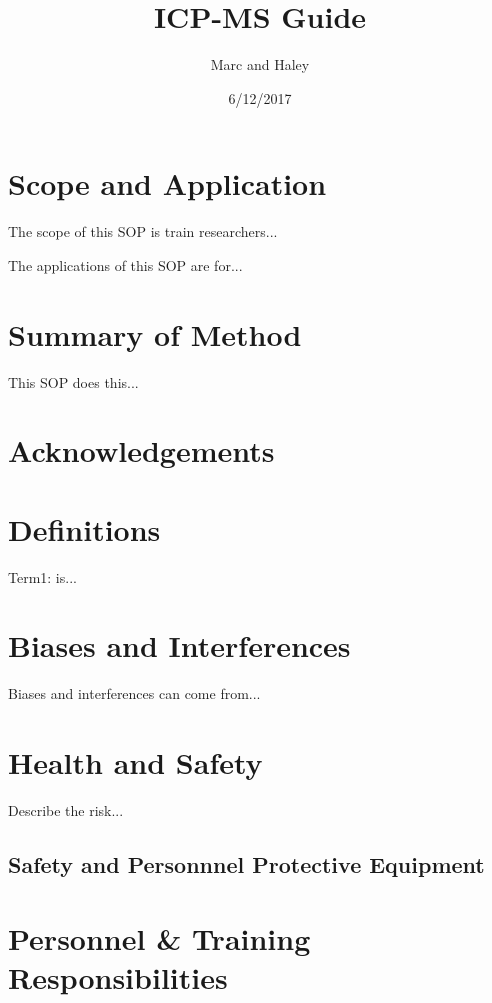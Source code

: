 \documentclass[12pt]{../SOP3_beta}\usepackage[]{graphicx}\usepackage[]{color}
\title{ICP-MS Guide}
\date{6/12/2017}
\author{Marc and Haley}
\begin{document}

\maketitle

\section{Scope and Application}

\NP The scope of this SOP is train researchers...

\NP The applications of this SOP are for...

\section{Summary of Method}

\NP This SOP does this...

\tableofcontents

\newpage

\section{Acknowledgements}

\section{Definitions}

\NP Term1: is...

\section{Biases and Interferences}

\NP Biases and interferences can come from...

\section{Health and Safety}

\NP Describe the risk...


\subsection{Safety and Personnnel Protective Equipment}


\section{Personnel \& Training Responsibilities}
\end{document}
